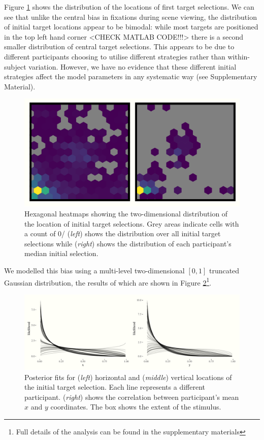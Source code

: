 \documentclass[vision,article,submit,pdftex,moreauthors]{Definitions/mdpi}
\begin{document}
Figure \ref{fig:qjep_init_sel_hex} shows the distribution of the locations of first target selections. We can see that unlike the central bias in fixations during scene viewing, the distribution of initial target locations appear to be bimodal: while most targets are positioned in the top left hand corner <CHECK MATLAB CODE!!!> there is a second smaller distribution of central target selections. This appears to be due to different participants choosing to utilise different strategies rather than within-subject variation. However, we have no evidence that these different initial strategies affect the model parameters in any systematic way (see Supplementary Material).

\begin{figure}[H]
\centering
\includegraphics[width=12 cm]{Figures/init_sel_hex_plot.pdf}
\caption{Hexagonal heatmaps showing the two-dimensional distribution of the location of initial target selections. Grey areas indicate cells with a count of 0/ (\textit{left}) shows the distribution over all initial target selections while (\textit{right}) shows the distribution of each participant's median initial selection. }
\label{fig:qjep_init_sel_hex}
\end{figure} 

We modelled this bias using a multi-level two-dimensional $[0, 1]$ truncated Gaussian distribution, the results of which are shown in Figure \ref{fig:qjep_init_sel_mdl}\footnote{Full details of the analysis can be found in the supplementary materials}.

\begin{figure}[H]
\centering
\includegraphics[width=12 cm]{Figures/init_sel_mdl.pdf}
\caption{Posterior fits for (\textit{left}) horizontal and (\textit{middle}) vertical locations of the initial target selection. Each line represents a different participant.  (\textit{right}) shows the correlation between participant's mean $x$ and $y$ coordinates. The box shows the extent of the stimulus.}
\label{fig:qjep_init_sel_mdl}
\end{figure} 
\end{document}
